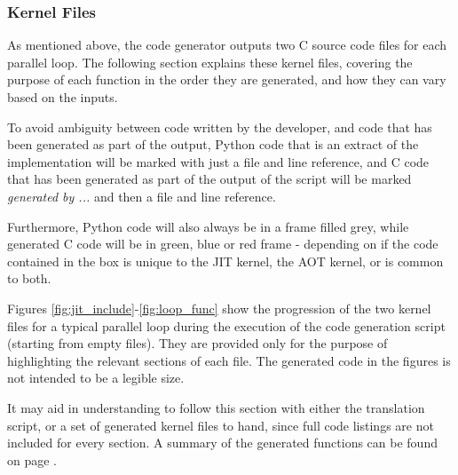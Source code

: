 \subsubsection{Kernel Files}
\label{ss:krnl_files}
As mentioned above, the code generator outputs two C source code files for each parallel loop. The following section explains these kernel files, covering the purpose of each function in the order they are generated, and how they can vary based on the inputs.
\par To avoid ambiguity between code written by the developer, and code that has been generated as part of the output, Python code that is an extract of the implementation will be marked with just a file and line reference, and C code that has been generated as part of the output of the script will be marked \textit{generated by ...} and then a file and line reference.
\par Furthermore, Python code will also always be in a frame filled grey, while generated C code will be in green, blue or red frame - depending on if the code contained in the box is unique to the JIT kernel, the AOT kernel, or is common to both.


\par
Figures \ref{fig:jit_include}-\ref{fig:loop_func} show the progression of the two kernel files for a typical parallel loop during the execution of the code generation script (starting from empty files). They are provided only for the purpose of highlighting the relevant sections of each file. The generated code in the figures is not intended to be a legible size.
\par
It may aid in understanding to follow this section with either the translation script, or a set of generated kernel files to hand, since  full code listings are not included for every section. A summary of the generated functions can be found on page \pageref{impl_summary}.

